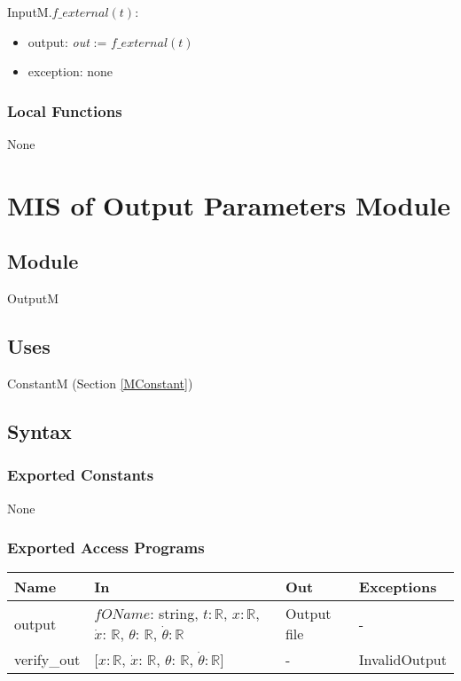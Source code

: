 \documentclass[12pt, titlepage]{article}
\begin{document}
\noindent InputM.$f\_external(t)$:
\begin{itemize}
\item output: \textit{out} := $f\_external(t)$
\item exception: none
\end{itemize}\noindent 


\subsubsection{Local Functions}
None

\newpage
\section{MIS of Output Parameters Module\label{MOutput} }


\subsection{Module}
OutputM

\subsection{Uses}
ConstantM (Section \ref{MConstant})

\subsection{Syntax}

\subsubsection{Exported Constants}
None
\subsubsection{Exported Access Programs}

\begin{center}
\begin{tabular}{p{2cm} p{8cm} p{2cm} p{2cm}}
\hline
\textbf{Name} & \textbf{In} & \textbf{Out} & \textbf{Exceptions} \\
\hline
 output& $fOName$: string, $t$$: \mathbb{R}$, $x$$: \mathbb{R}$, $\dot{x}$: $\mathbb{R}$, $\theta$: $\mathbb{R}$, $\dot{\theta}$$: 
 \mathbb{R}$ & Output file & -\\
\hline
verify\_out&  [$x$$: \mathbb{R}$, $\dot{x}$: $\mathbb{R}$, $\theta$: $\mathbb{R}$, $\dot{\theta}$$: 
 \mathbb{R}$] & - & InvalidOutput \\
\end{tabular}
\end{center}
\end{document}
